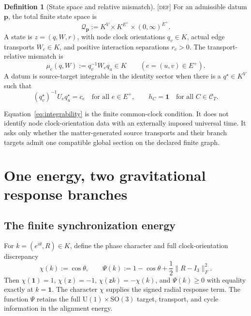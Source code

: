 \documentclass[11pt]{article}
\newcommand{\Id}{\ensuremath{\mathbf 1}}
\newcommand{\zinv}{\ensuremath{\mathsf z}}
\newcommand{\State}{\ensuremath{\mathcal Q}}
\newcommand{\Defn}{\textsc{[def]}}
\theoremstyle{definition}
\newtheorem{definition}{Definition}[section]
\begin{document}
\begin{definition}[State space and relative mismatch]
\label{def:state}
\Defn{} For an admissible datum $\mathbf p$, the total finite state space is
\begin{equation}
\State_{\mathbf p}:=K^V\times K^{E^+}\times(0,\infty)^{E^+}.
\label{eq:state-space}
\end{equation}
A state is $z=(q,W,r)$, with node clock orientations $q_v\in K$, actual
edge transports $W_e\in K$, and positive interaction separations $r_e>0$.
The transport-relative mismatch is
\begin{equation}
\mu_e(q,W):=q_v^{-1}W_eq_u\in K
\qquad(e=(u,v)\in E^+).
\label{eq:mismatch}
\end{equation}
A datum is source-target integrable in the identity sector when there is a
$q^\star\in K^V$ such that
\begin{equation}
(q_v^\star)^{-1}U_eq_u^\star=c_e
\quad\text{for all }e\in E^+,
\qquad h_C=\Id\quad\text{for all }C\in\mathcal C_T.
\label{eq:integrability}
\end{equation}
\end{definition}

Equation~\eqref{eq:integrability} is the finite common-clock condition.  It does
not identify node clock-orientation data with an externally imposed universal
time.  It asks only whether the matter-generated source transports and their
branch targets admit one compatible global section on the declared finite graph.

\section{One energy, two gravitational response branches}
\label{sec:energy}

\subsection{The finite synchronization energy}

For $k=(e^{i\theta},R)\in K$, define the phase character and full
clock-orientation discrepancy
\begin{equation}
\chi(k):=\cos\theta,
\qquad
\Psi(k):=1-\cos\theta+\frac{1}{2}\lVert R-I_3\rVert_F^2.
\label{eq:character}
\end{equation}
Then $\chi(\Id)=1$, $\chi(\zinv)=-1$,
$\chi(\zinv k)=-\chi(k)$, and $\Psi(k)\ge0$ with equality exactly at
$k=\Id$.  The character $\chi$ supplies the signed radial response term.  The
function $\Psi$ retains the full $\mathrm U(1)\times\mathrm{SO}(3)$ target,
transport, and cycle information in the alignment energy.
\end{document}
